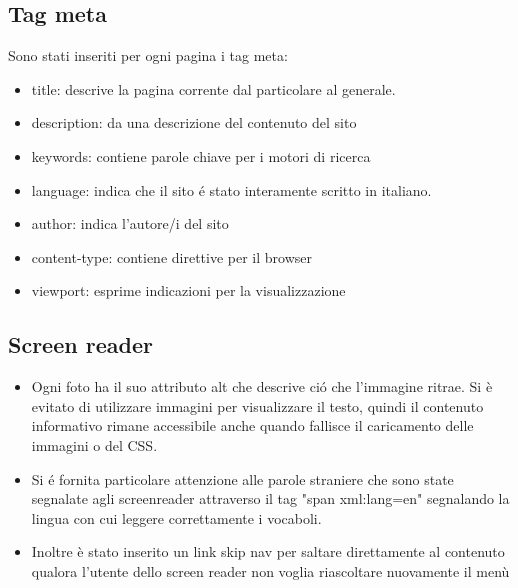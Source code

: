 \documentclass[12pt]{article}
\begin{document}
\begin{itemize}
		
				
			\end{itemize}	



			
			\newpage
			\subsection{Tag meta}
			
	 Sono stati inseriti per ogni pagina i tag meta:
	 		\begin{itemize}
				\item title: descrive la pagina corrente dal particolare al generale.
				\item description: da una descrizione del contenuto del sito
				\item keywords: contiene parole chiave per i motori di ricerca
				\item language: indica che il sito \'e stato interamente scritto in italiano.
				\item author: indica l'autore/i del sito
				\item content-type: contiene direttive per il browser
				\item viewport: esprime indicazioni per la visualizzazione
			\end{itemize}
			\subsection{Screen reader}
			\begin{itemize}
				\item Ogni foto ha il suo attributo alt che descrive ci\'o che l'immagine ritrae.
				Si \`e evitato di utilizzare immagini per visualizzare il testo, quindi il contenuto informativo rimane accessibile anche quando fallisce il caricamento delle immagini o del CSS.
				\item Si \'e fornita particolare attenzione alle parole straniere che sono state segnalate agli screenreader attraverso il tag "span xml:lang=en" segnalando la lingua con cui leggere correttamente i vocaboli. 
				\item Inoltre \`e stato inserito un link skip nav per saltare direttamente al contenuto qualora l'utente dello screen reader non voglia riascoltare nuovamente il men\`u
			\end{itemize}
\end{document}
